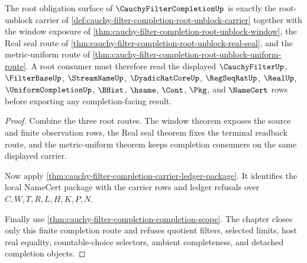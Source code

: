 \begin{theorem}
\label{thm:cauchy-filter-completion-root-unblock-namecert}
The root obligation surface of $\CauchyFilterCompletionUp$ is exactly the root-unblock carrier of \autoref{def:cauchy-filter-completion-root-unblock-carrier} together with the window exposure of \autoref{thm:cauchy-filter-completion-root-unblock-window}, the Real seal route of \autoref{thm:cauchy-filter-completion-root-unblock-real-seal}, and the metric-uniform route of \autoref{thm:cauchy-filter-completion-root-unblock-uniform-route}. A root consumer must therefore read the displayed $\CauchyFilterUp$, $\FilterBaseUp$, $\StreamNameUp$, $\DyadicRatCoreUp$, $\RegSeqRatUp$, $\RealUp$, $\UniformCompletionUp$, $\BHist$, $\hsame$, $\Cont$, $\Pkg$, and $\NameCert$ rows before exporting any completion-facing result.
\end{theorem}
\begin{proof}
Combine the three root routes. The window theorem exposes the source and finite observation rows, the Real seal theorem fixes the terminal readback route, and the metric-uniform theorem keeps completion consumers on the same displayed carrier.

Now apply \autoref{thm:cauchy-filter-completion-carrier-ledger-package}. It identifies the local NameCert package with the carrier rows and ledger refusals over $C,W,T,R,L,H,K,P,N$.

Finally use \autoref{thm:cauchy-filter-completion-completion-scope}. The chapter closes only this finite completion route and refuses quotient filters, selected limits, host real equality, countable-choice selectors, ambient completeness, and detached completion objects.
\end{proof}

